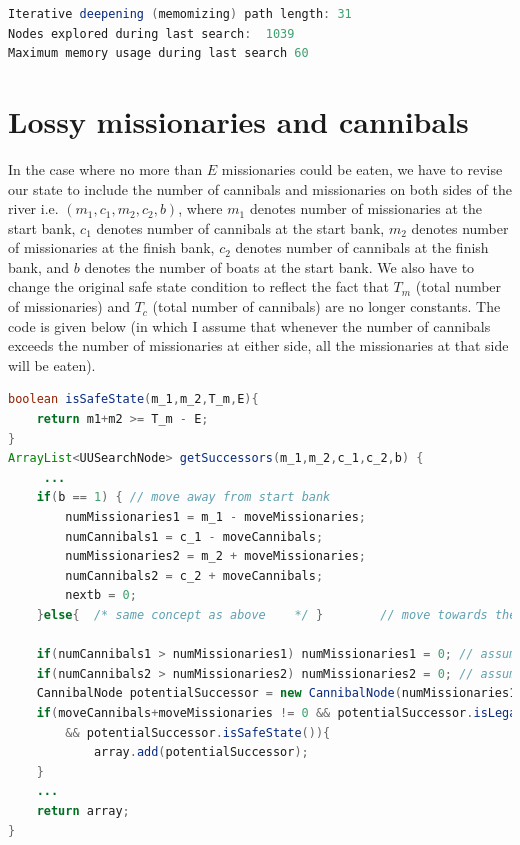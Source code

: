 \documentclass[9.5pt]{extarticle}
\begin{document}
\begin{lstlisting}[language=java,caption={Iterative deepening search using memomizing DFS for start state of (8,5,1)}]
Iterative deepening (memomizing) path length: 31 
Nodes explored during last search:  1039
Maximum memory usage during last search 60
\end{lstlisting}

\section{Lossy missionaries and cannibals}

In the case where no more than $E$ missionaries could be eaten, we have to revise our state to include the number of cannibals and missionaries on both sides of the river i.e. $(m_1,c_1,m_2,c_2,b)$, where $m_1$ denotes number of missionaries at the start bank, $c_1$ denotes number of cannibals at the start bank, $m_2$ denotes number of missionaries at the finish bank, $c_2$ denotes number of cannibals at the finish bank, and $b$ denotes the number of boats at the start bank. We also have to change the original safe state condition to reflect the fact that $T_m$ (total number of missionaries) and $T_c$ (total number of cannibals) are no longer constants. The code is given below (in which I assume that whenever the number of cannibals exceeds the number of missionaries at either side, all the missionaries at that side will be eaten).

\begin{lstlisting}[language=java,caption={modified isSafeState and getSuccessors}]
boolean isSafeState(m_1,m_2,T_m,E){
	return m1+m2 >= T_m - E;
}
ArrayList<UUSearchNode> getSuccessors(m_1,m_2,c_1,c_2,b) {
	 ...
	if(b == 1) { // move away from start bank
		numMissionaries1 = m_1 - moveMissionaries;
		numCannibals1 = c_1 - moveCannibals;
		numMissionaries2 = m_2 + moveMissionaries;
		numCannibals2 = c_2 + moveCannibals;
		nextb = 0;
	}else{ 	/* same concept as above	*/ }		// move towards the finish bank
		
	if(numCannibals1 > numMissionaries1) numMissionaries1 = 0; // assumption
	if(numCannibals2 > numMissionaries2) numMissionaries2 = 0; // assumption
	CannibalNode potentialSuccessor = new CannibalNode(numMissionaries1,numCannibals1,numMissionaries2,numCannibals2,nextb,depth);
	if(moveCannibals+moveMissionaries != 0 && potentialSuccessor.isLegalState()
		&& potentialSuccessor.isSafeState()){
			array.add(potentialSuccessor);
	}
	...
	return array;
}
\end{lstlisting}
\end{document}
